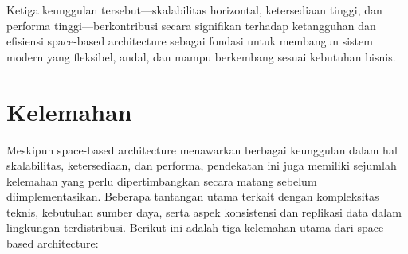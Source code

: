 Ketiga keunggulan tersebut—skalabilitas horizontal, ketersediaan tinggi, dan performa tinggi—berkontribusi secara signifikan terhadap ketangguhan dan efisiensi space-based architecture sebagai fondasi untuk membangun sistem modern yang fleksibel, andal, dan mampu berkembang sesuai kebutuhan bisnis.



\section{Kelemahan}

Meskipun space-based architecture menawarkan berbagai keunggulan dalam hal skalabilitas, ketersediaan, dan performa, pendekatan ini juga memiliki sejumlah kelemahan yang perlu dipertimbangkan secara matang sebelum diimplementasikan. Beberapa tantangan utama terkait dengan kompleksitas teknis, kebutuhan sumber daya, serta aspek konsistensi dan replikasi data dalam lingkungan terdistribusi. Berikut ini adalah tiga kelemahan utama dari space-based architecture:

